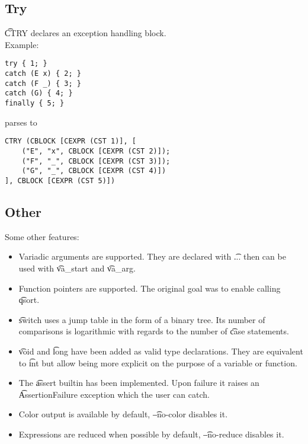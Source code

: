 \subsection{Try}
\t{CTRY} declares an exception handling block.\\
Example:
\begin{verbatim}
try { 1; }
catch (E x) { 2; }
catch (F _) { 3; }
catch (G) { 4; }
finally { 5; }
\end{verbatim}
parses to
\begin{verbatim}
CTRY (CBLOCK [CEXPR (CST 1)], [
    ("E", "x", CBLOCK [CEXPR (CST 2)]);
    ("F", "_", CBLOCK [CEXPR (CST 3)]);
    ("G", "_", CBLOCK [CEXPR (CST 4)])
], CBLOCK [CEXPR (CST 5)])
\end{verbatim}

\subsection{Other}
Some other features:
\begin{itemize}
    \item Variadic arguments are supported. They are declared with \t{...} then can be used with \t{va\_start} and \t{va\_arg}.
    \item Function pointers are supported. The original goal was to enable calling \t{qsort}.
    \item \t{switch} uses a jump table in the form of a binary tree. Its number of comparisons is logarithmic with regards to the number of \t{case} statements.
    \item \t{void} and \t{long} have been added as valid type declarations. They are equivalent to \t{int} but allow being more explicit on the purpose of a variable or function.
    \item The \t{assert} builtin has been implemented. Upon failure it raises an \t{AssertionFailure} exception which the user can catch.
    \item Color output is available by default, \t{--no-color} disables it.
    \item Expressions are reduced when possible by default, \t{--no-reduce} disables it.
\end{itemize}
